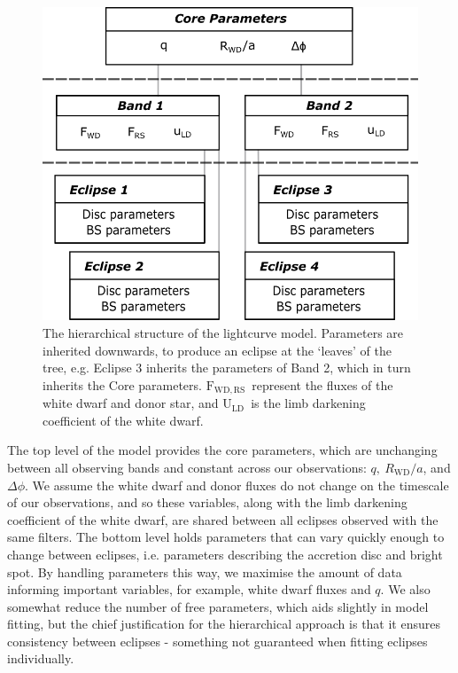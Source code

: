 \begin{figure}
    \centering
    \includegraphics[width=.85\columnwidth ]{figures/three_cvs_with_weird_colours/GeneralFigs/hierarchical_model_structure.png}
    \caption{The hierarchical structure of the lightcurve model. Parameters are inherited downwards, to produce an eclipse at the `leaves' of the tree, e.g. Eclipse 3 inherits the parameters of Band 2, which in turn inherits the Core parameters. $\mathrm{F_{WD, RS}}$\ represent the fluxes of the white dwarf and donor star, and $\mathrm{U_{LD}}$\ is the limb darkening coefficient of the white dwarf.}
    \label{fig:method:hierarchical_model}
\end{figure}

The top level of the model provides the core parameters, which are unchanging between all observing bands and constant across our observations: $q,\ R_\mathrm{WD}/a$, and $\Delta\phi$. We assume the white dwarf and donor fluxes do not change on the timescale of our observations, and so these variables, along with the limb darkening coefficient of the white dwarf, are shared between all eclipses observed with the same filters. The bottom level holds parameters that can vary quickly enough to change between eclipses, i.e. parameters describing the accretion disc and bright spot. By handling parameters this way, we maximise the amount of data informing important variables, for example, white dwarf fluxes and $q$. We also somewhat reduce the number of free parameters, which aids slightly in model fitting, but the chief justification for the hierarchical approach is that it ensures consistency between eclipses - something not guaranteed when fitting eclipses individually.

